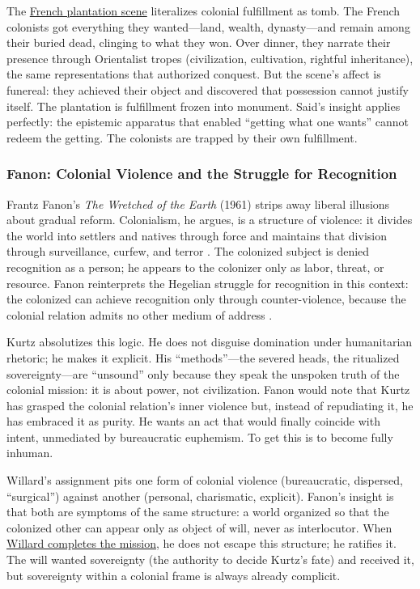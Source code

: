 The \hyperref[scene:french-plantation]{French plantation scene} literalizes colonial
fulfillment as tomb. The French colonists got everything they wanted---land, wealth,
dynasty---and remain among their buried dead, clinging to what they won. Over dinner, they
narrate their presence through Orientalist tropes (civilization, cultivation, rightful
inheritance), the same representations that authorized conquest. But the scene's affect is
funereal: they achieved their object and discovered that possession cannot justify itself. The
plantation is fulfillment frozen into monument. Said's insight applies perfectly: the
epistemic apparatus that enabled ``getting what one wants'' cannot redeem the getting. The
colonists are trapped by their own fulfillment.

\subsubsection*{Fanon: Colonial Violence and the Struggle for Recognition}
Frantz Fanon's \textit{The Wretched of the Earth} (1961) strips away liberal illusions about
gradual reform. Colonialism, he argues, is a structure of violence: it divides the world into
settlers and natives through force and maintains that division through surveillance, curfew,
and terror \parencite{FanonWretched2004}. The colonized subject is denied recognition as a
person; he appears to the colonizer only as labor, threat, or resource. Fanon reinterprets the
Hegelian struggle for recognition in this context: the colonized can achieve recognition only
through counter-violence, because the colonial relation admits no other medium of address
\parencite{FanonWretched2004}.

Kurtz absolutizes this logic. He does not disguise domination under humanitarian rhetoric; he
makes it explicit. His ``methods''---the severed heads, the ritualized sovereignty---are
``unsound'' only because they speak the unspoken truth of the colonial mission: it is about
power, not civilization. Fanon would note that Kurtz has grasped the colonial relation's inner
violence but, instead of repudiating it, he has embraced it as purity. He wants an act that
would finally coincide with intent, unmediated by bureaucratic euphemism. To get this is to
become fully inhuman.

Willard's assignment pits one form of colonial violence (bureaucratic, dispersed, ``surgical'')
against another (personal, charismatic, explicit). Fanon's insight is that both are symptoms
of the same structure: a world organized so that the colonized other can appear only as object
of will, never as interlocutor. When \hyperref[scene:assassination]{Willard completes the
	mission}, he does not escape this structure; he ratifies it. The will wanted sovereignty (the
authority to decide Kurtz's fate) and received it, but sovereignty within a colonial frame is
always already complicit.


